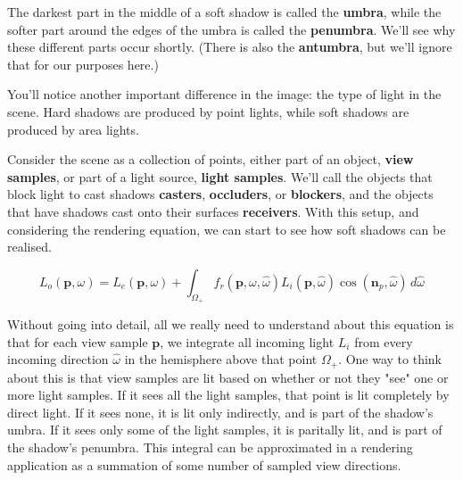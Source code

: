 \documentclass[acmsmall, screen, authorversion, nonacm]{acmart}
\begin{document}
The darkest part in the middle of a soft shadow is called the \textbf{umbra}, while the softer part around the edges of the umbra is called the \textbf{penumbra}. We'll see why these different parts occur shortly. (There is also the \textbf{antumbra}, but we'll ignore that for our purposes here.)

You'll notice another important difference in the image: the type of light in the scene. Hard shadows are produced by point lights, while soft shadows are produced by area lights.

Consider the scene as a collection of points, either part of an object, \textbf{view samples}, or part of a light source, \textbf{light samples}. We'll call the objects that block light to cast shadows \textbf{casters}, \textbf{occluders}, or \textbf{blockers}, and the objects that have shadows cast onto their surfaces \textbf{receivers}. With this setup, and considering the rendering equation\cite{akenine2019real}, we can start to see how soft shadows can be realised.

\begin{equation}
  L_o \left(\textbf{p}, \omega\right) = L_e(\textbf{p}, \omega) + \int_{\Omega_+}{f_r\left(\textbf{p}, \omega, \hat{\omega}\right) L_i\left(\textbf{p}, \hat{\omega}\right) \cos\left(\textbf{n}_p, \hat{\omega}\right) }\,d\hat{\omega}
\end{equation}

Without going into detail, all we really need to understand about this equation is that for each view sample \begin{math} \textbf{p} \end{math}, we integrate all incoming light \begin{math} L_i \end{math} from every incoming direction \begin{math} \hat{\omega} \end{math} in the hemisphere above that point \begin{math} \Omega_+ \end{math}. One way to think about this is that view samples are lit based on whether or not they "see" one or more light samples. If it sees all the light samples, that point is lit completely by direct light. If it sees none, it is lit only indirectly, and is part of the shadow's umbra. If it sees only some of the light samples, it is paritally lit, and is part of the shadow's penumbra. This integral can be approximated in a rendering application as a summation of some number of sampled view directions.
\end{document}
